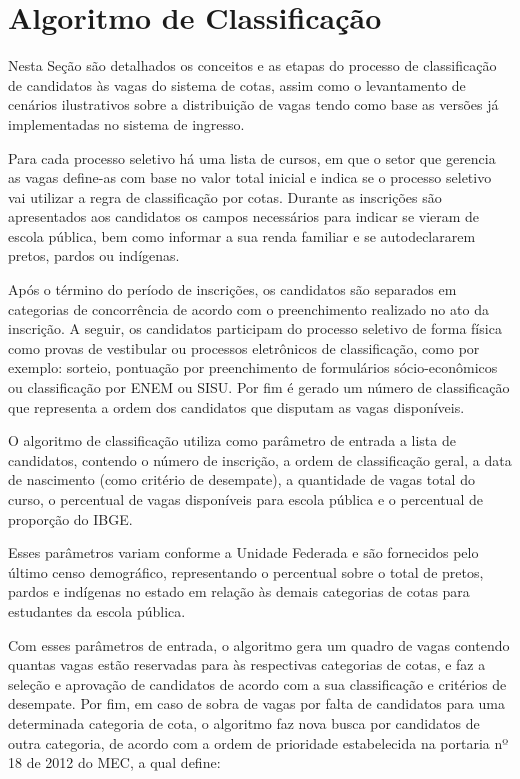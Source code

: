 \section{Algoritmo de Classificação}
\label{algoritimodeclassificacao}

Nesta Seção são detalhados os conceitos e as etapas do processo de classificação de candidatos às vagas do sistema de cotas, assim como o levantamento de cenários ilustrativos sobre a distribuição de vagas tendo como base as versões já implementadas no sistema de ingresso.

Para cada processo seletivo há uma lista de cursos, em que o setor que gerencia as vagas define-as com base no valor total inicial e indica se o processo seletivo vai utilizar a regra de classificação por cotas. Durante as inscrições são apresentados aos candidatos os campos necessários para indicar se vieram de escola pública, bem como informar a sua renda familiar e se autodeclararem pretos, pardos ou indígenas.

Após o término do período de inscrições, os candidatos são separados em categorias de concorrência de acordo com o preenchimento realizado no ato da inscrição. A seguir, os candidatos participam do processo seletivo de forma física como provas de vestibular ou processos eletrônicos de classificação, como por exemplo: sorteio, pontuação por preenchimento de formulários sócio-econômicos ou classificação por \gls{ENEM} ou \gls{SISU}. Por fim é gerado um número de classificação que representa a ordem dos candidatos que disputam as vagas disponíveis.

O algoritmo de classificação utiliza como parâmetro de entrada a lista de candidatos, contendo o número de inscrição, a ordem de classificação geral, a data de nascimento (como critério de desempate), a quantidade de vagas total do curso, o percentual de vagas disponíveis para escola pública e o percentual de proporção do \gls{IBGE}.

Esses parâmetros variam conforme a Unidade Federada e são fornecidos pelo último censo demográfico, representando o percentual sobre o total de pretos, pardos e indígenas no estado em relação às demais categorias de cotas para estudantes da escola pública.

Com esses parâmetros de entrada, o algoritmo gera um quadro de vagas contendo quantas vagas estão reservadas para às respectivas categorias de cotas, e faz a seleção e aprovação de candidatos de acordo com a sua classificação e critérios de desempate. Por fim, em caso de sobra de vagas por falta de candidatos para uma determinada categoria de cota, o algoritmo faz nova busca por candidatos de outra categoria, de acordo com a ordem de prioridade estabelecida na portaria nº 18 de 2012 do \gls{MEC}, a qual define:

